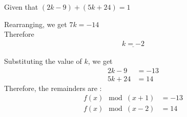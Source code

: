 \documentclass[11pt, oneside, twocolumn]{amsart}   	%
\begin{document}
Given that $(2k - 9) + (5k + 24) = 1$
		
Rearranging, we get $7k = -14$ \\
		
Therefore \begin{align} \underline{k = -2} \end{align}
		
Substituting the value of $k$, we get
	\begin{align}
		2k - 9 &= -13 \\
		5k + 24 &= 14
\end{align}
Therefore, the remainders are :
\begin{align}
	f(x) \mod (x + 1) &= -13 \\
	f(x) \mod (x - 2) &= 14
\end{align}
\end{document}
